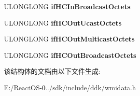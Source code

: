 \begin{DoxyCompactItemize}
U\+L\+O\+N\+G\+L\+O\+NG {\bfseries if\+H\+C\+In\+Broadcast\+Octets}
\item 
\mbox{\label{struct___m_s_ndis___statistics_info_a4ab999efc3046938a5828f152f50160b}} 
U\+L\+O\+N\+G\+L\+O\+NG {\bfseries if\+H\+C\+Out\+Ucast\+Octets}
\item 
\mbox{\label{struct___m_s_ndis___statistics_info_ab39ff25525b20062dd2b884063a35517}} 
U\+L\+O\+N\+G\+L\+O\+NG {\bfseries if\+H\+C\+Out\+Multicast\+Octets}
\item 
\mbox{\label{struct___m_s_ndis___statistics_info_af5d0ab47bdb46e6bb07a36c82a4b83a0}} 
U\+L\+O\+N\+G\+L\+O\+NG {\bfseries if\+H\+C\+Out\+Broadcast\+Octets}
\end{DoxyCompactItemize}


该结构体的文档由以下文件生成\+:\begin{DoxyCompactItemize}
\item 
E\+:/\+React\+O\+S-\/0../sdk/include/ddk/wmidata.\+h\end{DoxyCompactItemize}
